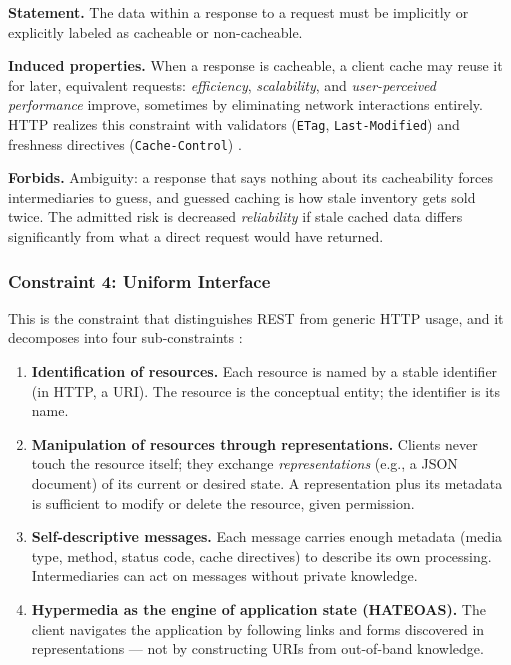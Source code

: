 \textbf{Statement.} The data within a response to a request must be implicitly or
explicitly labeled as cacheable or non-cacheable.

\textbf{Induced properties.} When a response is cacheable, a client cache may reuse
it for later, equivalent requests: \emph{efficiency}, \emph{scalability}, and
\emph{user-perceived performance} improve, sometimes by eliminating network
interactions entirely. HTTP realizes this constraint with validators
(\texttt{ETag}, \texttt{Last-Modified}) and freshness directives
(\texttt{Cache-Control}) \cite{rfc9110}.

\textbf{Forbids.} Ambiguity: a response that says nothing about its cacheability
forces intermediaries to guess, and guessed caching is how stale inventory gets
sold twice. The admitted risk is decreased \emph{reliability} if stale cached data
differs significantly from what a direct request would have returned.

\subsubsection{Constraint 4: Uniform Interface}

This is the constraint that distinguishes REST from generic HTTP usage, and it
decomposes into four sub-constraints \cite{fielding2000rest}:

\begin{enumerate}
  \item \textbf{Identification of resources.} Each resource is named by a stable
        identifier (in HTTP, a URI). The resource is the conceptual entity; the
        identifier is its name.
  \item \textbf{Manipulation of resources through representations.} Clients never
        touch the resource itself; they exchange \emph{representations} (e.g., a
        JSON document) of its current or desired state. A representation plus its
        metadata is sufficient to modify or delete the resource, given permission.
  \item \textbf{Self-descriptive messages.} Each message carries enough metadata
        (media type, method, status code, cache directives) to describe its own
        processing. Intermediaries can act on messages without private knowledge.
  \item \textbf{Hypermedia as the engine of application state (HATEOAS).} The
        client navigates the application by following links and forms discovered
        in representations --- not by constructing URIs from out-of-band
        knowledge.
\end{enumerate}


